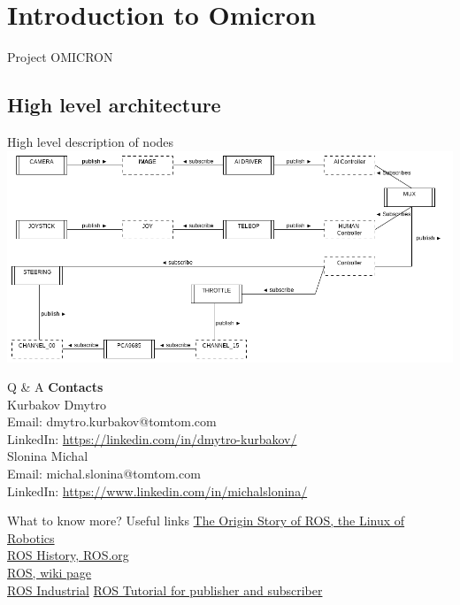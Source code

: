 \documentclass{beamer}
\begin{document}
\section{Introduction to Omicron}
\begin{frame}
\begin{center}
\Huge Project OMICRON
\end{center}
\end{frame}

\subsection{High level architecture}
\begin{frame}{High level description of nodes}
\includegraphics[scale=0.35]{images/omicron_graph} 
\end{frame}

\begin{frame}{Q \& A}
\textbf{Contacts}\\
\vfill
Kurbakov Dmytro\\
Email: dmytro.kurbakov@tomtom.com\\
LinkedIn: \url{https://linkedin.com/in/dmytro-kurbakov/}\\
\vfill
Slonina Michal\\
Email: michal.slonina@tomtom.com\\
LinkedIn: \url{https://www.linkedin.com/in/michalslonina/}\\
\end{frame}


\begin{frame}{What to know more? Useful links}
\href{https://spectrum.ieee.org/automaton/robotics/robotics-software/the-origin-story-of-ros-the-linux-of-robotics}{The Origin Story of ROS, the Linux of Robotics}\\
\href{https://www.ros.org/history/}{ROS History, ROS.org}\\
\href{https://en.wikipedia.org/wiki/Robot_Operating_System}{ROS, wiki page}\\
\href{http://wiki.ros.org/Industrial/Tutorials}{ROS Industrial}
\href{https://wiki.ros.org/ROS/Tutorials/WritingPublisherSubscriber\%28python\%29}{ROS Tutorial for publisher and subscriber}
\end{frame}
\end{document}
